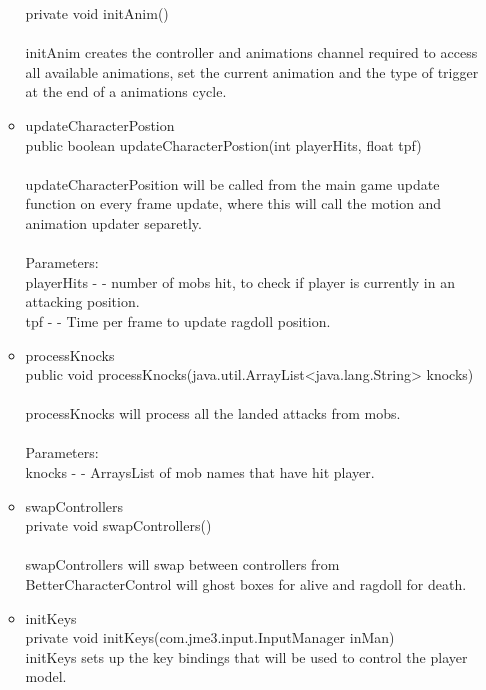 \documentclass[letterpaper]{article}
\begin{document}
\begin{itemize}
\begin{itemize}
															private void initAnim() \\ \\
															initAnim creates the controller and animations channel required to access all available animations, set the current animation and the type of trigger at the end of a animations cycle.
													\item	updateCharacterPostion \\
															public boolean updateCharacterPostion(int playerHits,
															                             float tpf) \\ \\
															updateCharacterPosition will be called from the main game update function on every frame update, where this will call the motion and animation updater separetly. \\ \\
															Parameters: \\
															playerHits - - number of mobs hit, to check if player is currently in an attacking position. \\
															tpf - - Time per frame to update ragdoll position. \\
													\item	processKnocks \\
															public void processKnocks(java.util.ArrayList<java.lang.String> knocks) \\ \\
															processKnocks will process all the landed attacks from mobs. \\ \\
															Parameters: \\
															knocks - - ArraysList of mob names that have hit player. \\
													\item	swapControllers \\
															private void swapControllers() \\ \\
															swapControllers will swap between controllers from BetterCharacterControl will ghost boxes for alive and ragdoll for death. \\
													\item	initKeys \\
															private void initKeys(com.jme3.input.InputManager inMan) \\
															initKeys sets up the key bindings that will be used to control the player model. \\ \\

\end{itemize}
\end{itemize}
\end{document}
